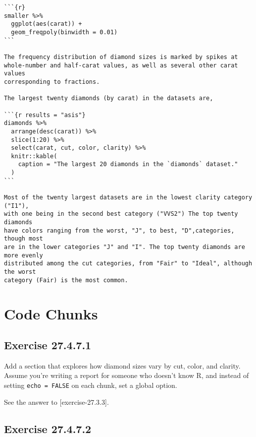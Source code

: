 \documentclass[]{book}
\theoremstyle{plain}
\theoremstyle{remark}
\begin{document}
\begin{verbatim}
```{r}
smaller %>%
  ggplot(aes(carat)) +
  geom_freqpoly(binwidth = 0.01)
```

The frequency distribution of diamond sizes is marked by spikes at
whole-number and half-carat values, as well as several other carat values
corresponding to fractions.

The largest twenty diamonds (by carat) in the datasets are,

```{r results = "asis"}
diamonds %>%
  arrange(desc(carat)) %>%
  slice(1:20) %>%
  select(carat, cut, color, clarity) %>%
  knitr::kable(
    caption = "The largest 20 diamonds in the `diamonds` dataset."
  )
```

Most of the twenty largest datasets are in the lowest clarity category ("I1"),
with one being in the second best category ("VVS2") The top twenty diamonds 
have colors ranging from the worst, "J", to best, "D",categories, though most
are in the lower categories "J" and "I". The top twenty diamonds are more evenly
distributed among the cut categories, from "Fair" to "Ideal", although the worst
category (Fair) is the most common.
\end{verbatim}

\hypertarget{code-chunks}{%
\section{Code Chunks}\label{code-chunks}}

\hypertarget{exercise-27.4.7.1}{%
\subsection*{\texorpdfstring{Exercise
{27.4.7.1}}{Exercise 27.4.7.1}}\label{exercise-27.4.7.1}}

Add a section that explores how diamond sizes vary by cut, color, and
clarity. Assume you're writing a report for someone who doesn't know R,
and instead of setting \texttt{echo\ =\ FALSE} on each chunk, set a
global option.

See the answer to {[}exercise-27.3.3{]}.

\hypertarget{exercise-27.4.7.2}{%
\subsection*{\texorpdfstring{Exercise
{27.4.7.2}}{Exercise 27.4.7.2}}\label{exercise-27.4.7.2}}
\end{document}
